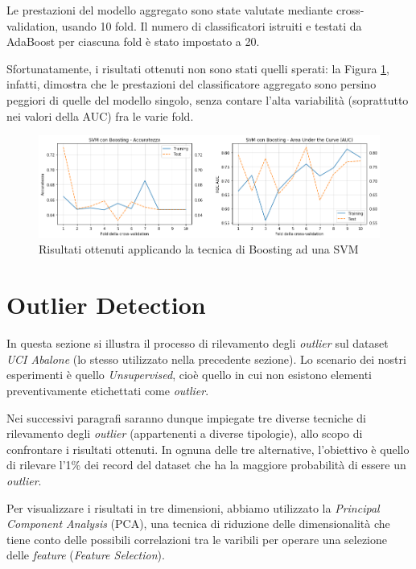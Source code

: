 \documentclass[a4paper]{article}
\begin{document}
Le prestazioni del modello aggregato sono state valutate mediante cross-validation, usando 10 fold. Il numero di classificatori istruiti e testati da AdaBoost per ciascuna fold è stato impostato a 20.

Sfortunatamente, i risultati ottenuti non sono stati quelli sperati: la Figura \ref{fig:boosting}, infatti, dimostra che le prestazioni del classificatore aggregato sono persino peggiori di quelle del modello singolo, senza contare l'alta variabilità (soprattutto nei valori della AUC) fra le varie fold.

\begin{figure}
\includegraphics[width=\textwidth]{images/boosting.png}
\caption{Risultati ottenuti applicando la tecnica di Boosting ad una SVM}
\label{fig:boosting}
\end{figure}

\newpage

\section{Outlier Detection}

In questa sezione si illustra il processo di rilevamento degli \textit{outlier} sul dataset \textit{UCI Abalone} (lo stesso utilizzato nella precedente sezione). Lo scenario dei nostri esperimenti è quello \textit{Unsupervised}, cioè quello in cui non esistono elementi preventivamente etichettati come \textit{outlier}.

Nei successivi paragrafi saranno dunque impiegate tre diverse tecniche di rilevamento degli \textit{outlier} (appartenenti a diverse tipologie), allo scopo di confrontare i risultati ottenuti. In ognuna delle tre alternative, l'obiettivo è quello di rilevare l'1\% dei record del dataset che ha la maggiore probabilità di essere un \textit{outlier}. 

Per visualizzare i risultati in tre dimensioni, abbiamo utilizzato la \textit{Principal Component Analysis} (PCA), una tecnica di riduzione delle dimensionalità che tiene conto delle possibili correlazioni tra le varibili per operare una selezione delle \textit{feature} (\textit{Feature Selection}).
\end{document}
